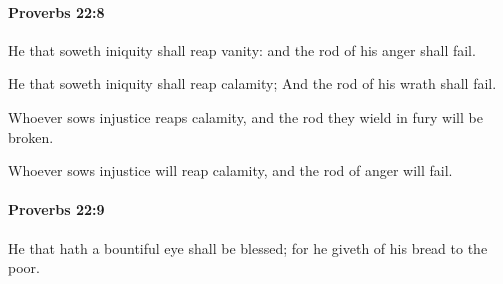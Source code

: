 		\paragraph{Proverbs 22:8} %
			\label{PROVERBS-22-8}

			He that soweth iniquity shall reap vanity: and the rod of his anger shall fail.

			\begin{versebox}
					\item[BHS] 
					\item[ASV] He that soweth iniquity shall reap calamity; And the rod of his wrath shall fail.
					\item[NIV] Whoever sows injustice reaps calamity, and the rod they wield in fury will be broken.
					\item[NRSV] Whoever sows injustice will reap calamity, and the rod of anger will fail.
			\end{versebox}

		\paragraph{Proverbs 22:9} %
			\label{PROVERBS-22-9}

			He that hath a bountiful eye shall be blessed; for he giveth of his bread to the poor.

